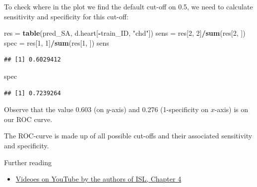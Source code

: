 \documentclass[10pt,ignorenonframetext,]{beamer}
\newenvironment{Shaded}{\begin{snugshade}}{\end{snugshade}}
\newcommand{\KeywordTok}[1]{\textcolor[rgb]{0.13,0.29,0.53}{\textbf{#1}}}
\newcommand{\DecValTok}[1]{\textcolor[rgb]{0.00,0.00,0.81}{#1}}
\newcommand{\StringTok}[1]{\textcolor[rgb]{0.31,0.60,0.02}{#1}}
\newcommand{\OperatorTok}[1]{\textcolor[rgb]{0.81,0.36,0.00}{\textbf{#1}}}
\newcommand{\NormalTok}[1]{#1}
\providecommand{\tightlist}{%
  \setlength{\itemsep}{0pt}\setlength{\parskip}{0pt}}
\begin{document}
\begin{frame}[fragile]

To check where in the plot we find the default cut-off on 0.5, we need
to calculate sensitivity and specificity for this cut-off:

\scriptsize

\begin{Shaded}
\begin{Highlighting}[]
\NormalTok{res =}\StringTok{ }\KeywordTok{table}\NormalTok{(pred_SA, d.heart[}\OperatorTok{-}\NormalTok{train_ID, }\StringTok{"chd"}\NormalTok{])}
\NormalTok{sens =}\StringTok{ }\NormalTok{res[}\DecValTok{2}\NormalTok{, }\DecValTok{2}\NormalTok{]}\OperatorTok{/}\KeywordTok{sum}\NormalTok{(res[}\DecValTok{2}\NormalTok{, ])}
\NormalTok{spec =}\StringTok{ }\NormalTok{res[}\DecValTok{1}\NormalTok{, }\DecValTok{1}\NormalTok{]}\OperatorTok{/}\KeywordTok{sum}\NormalTok{(res[}\DecValTok{1}\NormalTok{, ])}
\NormalTok{sens}
\end{Highlighting}
\end{Shaded}

\begin{verbatim}
## [1] 0.6029412
\end{verbatim}

\begin{Shaded}
\begin{Highlighting}[]
\NormalTok{spec}
\end{Highlighting}
\end{Shaded}

\begin{verbatim}
## [1] 0.7239264
\end{verbatim}

\normalsize
Observe that the value 0.603 (on \(y\)-axis) and 0.276 (1-specificity on
\(x\)-axis) is on our ROC curve.

The ROC-curve is made up of all possible cut-offs and their associated
sensitivity and specificity.

\end{frame}

\begin{frame}{Further reading}

\begin{itemize}
\tightlist
\item
  \href{https://www.youtube.com/playlist?list=PL5-da3qGB5IC4vaDba5ClatUmFppXLAhE}{Videoes
  on YouTube by the authors of ISL, Chapter 4}
\end{itemize}

\end{frame}
\end{document}

